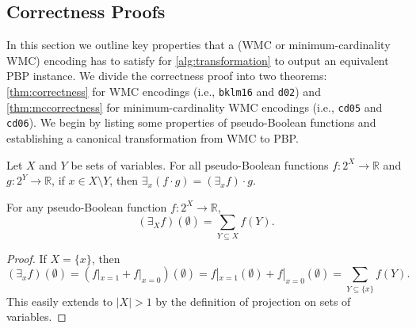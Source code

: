 \documentclass[runningheads]{llncs}
\begin{document}
\subsection{Correctness Proofs} \label{sec:proof}

In this section we outline key properties that a (WMC or minimum-cardinality
WMC) encoding has to satisfy for \cref{alg:transformation} to output an
equivalent PBP instance. We divide the correctness proof into two theorems:
\cref{thm:correctness} for WMC encodings (i.e., \texttt{bklm16} and
\texttt{d02}) and \cref{thm:mccorrectness} for minimum-cardinality WMC encodings
(i.e., \texttt{cd05} and \texttt{cd06}). We begin by listing some properties of
pseudo-Boolean functions and establishing a canonical transformation from WMC
to PBP.

\begin{theorem} \label{thm:early}
  Let $X$ and $Y$ be sets of variables. For all pseudo-Boolean functions
  $f\colon 2^X \to \mathbb{R}$ and $g\colon 2^Y \to \mathbb{R}$, if $x \in X
  \setminus Y$, then $\exists_x (f \cdot g) = (\exists_x f) \cdot g$.
\end{theorem}

\begin{lemma} \label{lemma:sum}
  For any pseudo-Boolean function $f\colon 2^X \to \mathbb{R}$,
  \[
    (\exists_X f)(\emptyset) = \sum_{Y \subseteq X} f(Y).
  \]
\end{lemma}
\begin{proof}
  If $X = \{x\}$, then
  \[
    (\exists_xf)(\emptyset) = (f|_{x=1} + f|_{x=0})(\emptyset) =
    f|_{x=1}(\emptyset) + f|_{x=0}(\emptyset) = \sum_{Y \subseteq \{x\}} f(Y).
  \]
  This easily extends to $|X| > 1$ by the definition of projection on sets of
  variables.
\end{proof}
\end{document}
